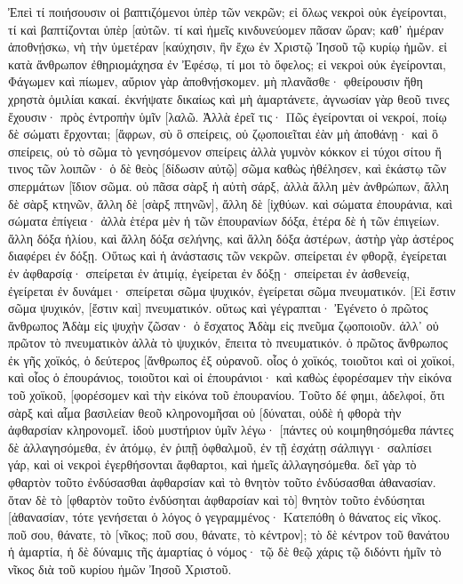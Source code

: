 Ἐπεὶ τί ποιήσουσιν οἱ βαπτιζόμενοι ὑπὲρ τῶν νεκρῶν; εἰ ὅλως νεκροὶ οὐκ ἐγείρονται, τί καὶ βαπτίζονται ὑπὲρ [αὐτῶν. 
τί καὶ ἡμεῖς κινδυνεύομεν πᾶσαν ὥραν; 
καθ᾽ ἡμέραν ἀποθνῄσκω, νὴ τὴν ὑμετέραν [καύχησιν, ἣν ἔχω ἐν Χριστῷ Ἰησοῦ τῷ κυρίῳ ἡμῶν. 
εἰ κατὰ ἄνθρωπον ἐθηριομάχησα ἐν Ἐφέσῳ, τί μοι τὸ ὄφελος; εἰ νεκροὶ οὐκ ἐγείρονται, Φάγωμεν καὶ πίωμεν, αὔριον γὰρ ἀποθνῄσκομεν. 
μὴ πλανᾶσθε· φθείρουσιν ἤθη χρηστὰ ὁμιλίαι κακαί. 
ἐκνήψατε δικαίως καὶ μὴ ἁμαρτάνετε, ἀγνωσίαν γὰρ θεοῦ τινες ἔχουσιν· πρὸς ἐντροπὴν ὑμῖν [λαλῶ. 
Ἀλλὰ ἐρεῖ τις· Πῶς ἐγείρονται οἱ νεκροί, ποίῳ δὲ σώματι ἔρχονται; 
[ἄφρων, σὺ ὃ σπείρεις, οὐ ζῳοποιεῖται ἐὰν μὴ ἀποθάνῃ· 
καὶ ὃ σπείρεις, οὐ τὸ σῶμα τὸ γενησόμενον σπείρεις ἀλλὰ γυμνὸν κόκκον εἰ τύχοι σίτου ἤ τινος τῶν λοιπῶν· 
ὁ δὲ θεὸς [δίδωσιν αὐτῷ] σῶμα καθὼς ἠθέλησεν, καὶ ἑκάστῳ τῶν σπερμάτων [ἴδιον σῶμα. 
οὐ πᾶσα σὰρξ ἡ αὐτὴ σάρξ, ἀλλὰ ἄλλη μὲν ἀνθρώπων, ἄλλη δὲ σὰρξ κτηνῶν, ἄλλη δὲ [σὰρξ πτηνῶν], ἄλλη δὲ [ἰχθύων. 
καὶ σώματα ἐπουράνια, καὶ σώματα ἐπίγεια· ἀλλὰ ἑτέρα μὲν ἡ τῶν ἐπουρανίων δόξα, ἑτέρα δὲ ἡ τῶν ἐπιγείων. 
ἄλλη δόξα ἡλίου, καὶ ἄλλη δόξα σελήνης, καὶ ἄλλη δόξα ἀστέρων, ἀστὴρ γὰρ ἀστέρος διαφέρει ἐν δόξῃ. 
Οὕτως καὶ ἡ ἀνάστασις τῶν νεκρῶν. σπείρεται ἐν φθορᾷ, ἐγείρεται ἐν ἀφθαρσίᾳ· 
σπείρεται ἐν ἀτιμίᾳ, ἐγείρεται ἐν δόξῃ· σπείρεται ἐν ἀσθενείᾳ, ἐγείρεται ἐν δυνάμει· 
σπείρεται σῶμα ψυχικόν, ἐγείρεται σῶμα πνευματικόν. [Εἰ ἔστιν σῶμα ψυχικόν, [ἔστιν καὶ] πνευματικόν. 
οὕτως καὶ γέγραπται· Ἐγένετο ὁ πρῶτος ἄνθρωπος Ἀδὰμ εἰς ψυχὴν ζῶσαν· ὁ ἔσχατος Ἀδὰμ εἰς πνεῦμα ζῳοποιοῦν. 
ἀλλ᾽ οὐ πρῶτον τὸ πνευματικὸν ἀλλὰ τὸ ψυχικόν, ἔπειτα τὸ πνευματικόν. 
ὁ πρῶτος ἄνθρωπος ἐκ γῆς χοϊκός, ὁ δεύτερος [ἄνθρωπος ἐξ οὐρανοῦ. 
οἷος ὁ χοϊκός, τοιοῦτοι καὶ οἱ χοϊκοί, καὶ οἷος ὁ ἐπουράνιος, τοιοῦτοι καὶ οἱ ἐπουράνιοι· 
καὶ καθὼς ἐφορέσαμεν τὴν εἰκόνα τοῦ χοϊκοῦ, [φορέσομεν καὶ τὴν εἰκόνα τοῦ ἐπουρανίου. 
Τοῦτο δέ φημι, ἀδελφοί, ὅτι σὰρξ καὶ αἷμα βασιλείαν θεοῦ κληρονομῆσαι οὐ [δύναται, οὐδὲ ἡ φθορὰ τὴν ἀφθαρσίαν κληρονομεῖ. 
ἰδοὺ μυστήριον ὑμῖν λέγω· [πάντες οὐ κοιμηθησόμεθα πάντες δὲ ἀλλαγησόμεθα, 
ἐν ἀτόμῳ, ἐν ῥιπῇ ὀφθαλμοῦ, ἐν τῇ ἐσχάτῃ σάλπιγγι· σαλπίσει γάρ, καὶ οἱ νεκροὶ ἐγερθήσονται ἄφθαρτοι, καὶ ἡμεῖς ἀλλαγησόμεθα. 
δεῖ γὰρ τὸ φθαρτὸν τοῦτο ἐνδύσασθαι ἀφθαρσίαν καὶ τὸ θνητὸν τοῦτο ἐνδύσασθαι ἀθανασίαν. 
ὅταν δὲ τὸ [φθαρτὸν τοῦτο ἐνδύσηται ἀφθαρσίαν καὶ τὸ] θνητὸν τοῦτο ἐνδύσηται [ἀθανασίαν, τότε γενήσεται ὁ λόγος ὁ γεγραμμένος· Κατεπόθη ὁ θάνατος εἰς νῖκος. 
ποῦ σου, θάνατε, τὸ [νῖκος; ποῦ σου, θάνατε, τὸ κέντρον]; 
τὸ δὲ κέντρον τοῦ θανάτου ἡ ἁμαρτία, ἡ δὲ δύναμις τῆς ἁμαρτίας ὁ νόμος· 
τῷ δὲ θεῷ χάρις τῷ διδόντι ἡμῖν τὸ νῖκος διὰ τοῦ κυρίου ἡμῶν Ἰησοῦ Χριστοῦ. 

